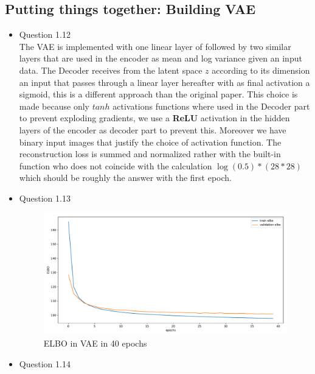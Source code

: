 \documentclass{article}
\begin{document}
  \subsection{Putting things together: Building VAE}
    \begin{itemize}
      \item Question 1.12 \\
      The VAE is implemented with one linear layer of followed by two similar layers that are used in the encoder as mean and log variance given an input data. The Decoder receives from the latent space $z$ according to its dimension an input that passes through a linear layer hereafter with as final activation a sigmoid, this is a different approach than the original paper. This choice is made because only $tanh$ activations functions where used in the Decoder part to prevent exploding gradients, we use a  \textbf{ReLU} activation in the hidden layers of the encoder as decoder part to prevent this. Moreover we have binary input images that justify the choice of activation function. The reconstruction loss is summed and normalized rather with the built-in function who does not coincide with the calculation $\log(0.5) * (28*28)$ which should be roughly the answer with the first epoch. 
      \item Question 1.13 \\
      \begin{figure}[H]
        \centering
        \includegraphics[width=\linewidth]{elbo.pdf}
        \caption{ELBO in VAE in 40 epochs}
        \label{fig:elbo_vae}
      \end{figure}
      \item Question 1.14 \\
      \begin{figure}[htbp]
        \centering

\end{figure}
\end{itemize}
\end{document}
